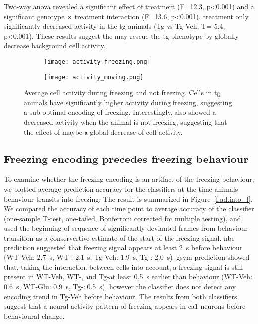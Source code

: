 Two-way \gls{anova} revealed a significant effect of treatment (F=12.3, p<0.001) and a significant genotype $\times$ treatment interaction (F=13.6, p<0.001). \tglu treatment only significantly decreased activity in the \gls{tg} animals (Tg-\glu vs Tg-Veh, T=-5.4, p<0.001). These results suggest the \tglu{} may rescue the \gls{tg} phenotype by globally decrease background cell activity.
\begin{figure}[h]
    \begin{subfigure}[h]{\textwidth}
        \texttt{[image: activity\_freezing.png]}
        \caption{\label{f.ad.actf}}
    \end{subfigure}
    \begin{subfigure}[h]{\textwidth}
        \texttt{[image: activity\_moving.png]}
        \caption{\label{f.ad.actnf}}
    \end{subfigure}
    \caption{Average cell activity during  freezing and  not freezing. Cells in \gls{tg} animals have significantly higher activity during freezing, suggesting a sub-optimal encoding of freezing. Interestingly, \tglu also showed a decreased activity when the animal is not freezing, suggesting that the effect of \tglu maybe a global decrease of cell activity. \label{f.ad.activity_freezing}}
\end{figure}

\subsection{Freezing encoding precedes freezing behaviour}

To examine whether the freezing encoding is an artifact of the freezing behaviour, we plotted average prediction accuracy for the classifiers at the time animals behaviour transits into freezing. The result is summarized in Figure~\ref{f.ad.into_f}. We compared the accuracy of each time point to average accuracy of the classifier (one-sample T-test, one-tailed, Bonferroni corrected for multiple testing), and used the beginning of sequence of significantly devianted frames from behaviour transition as a conservertive estimate of the start of the freezing signal. \Gls{nbc} prediction suggested that freezing signal appears at least \SI{2}{\second} before behaviour (WT-Veh: \SI{2.7}{\second}, WT-\glu: \SI{2.1}{\second}, Tg-Veh: \SI{1.9}{\second}, Tg-\glu: \SI{2.0}{\second}). \Gls{gsvm} prediction showed that, taking the interaction between cells into account, a freezing signal is still present in WT-Veh, WT-\glu, and Tg-\glu at least \SI{0.5}{\second} earlier than behaviour (WT-Veh: \SI{0.6}{\second}, WT-Glu: \SI{0.9}{\second}, Tg-\glu: \SI{0.5}{\second}), however the classifier does not detect any encoding trend in Tg-Veh before behaviour. The results from both classifiers suggest that a neural activity pattern of freezing appears in \gls{ca1} neurons before behavioural change.

